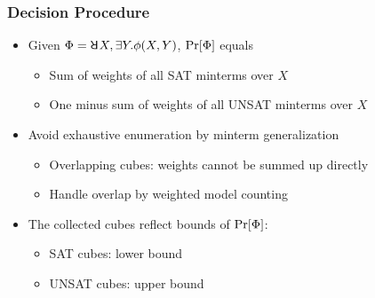 \begin{frame}
  \frametitle{Decision Procedure}
  \begin{itemize}
    \item Given $\Qf=\random{} X,\exists Y.\pf(X,Y)$, $\Pr[\Phi]$ equals
          \pause
          \begin{itemize}
            \item Sum of weights of all SAT minterms over $X$
                  \pause
            \item One minus sum of weights of all UNSAT minterms over $X$
                  \pause
          \end{itemize}
    \item Avoid exhaustive enumeration by minterm generalization
          \pause
          \begin{itemize}
            \item Overlapping cubes: weights cannot be summed up directly
                  \pause
            \item Handle overlap by weighted model counting
                  \pause
          \end{itemize}
    \item The collected cubes reflect bounds of $\Pr[\Phi]$:
          \pause
          \begin{itemize}
            \item SAT cubes: lower bound
                  \pause
            \item UNSAT cubes: upper bound
          \end{itemize}
  \end{itemize}
\end{frame}

